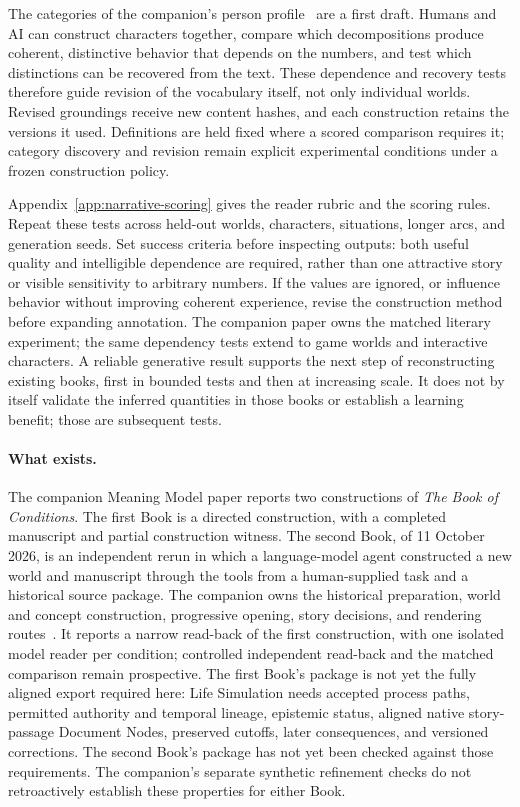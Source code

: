 \documentclass[10pt]{article}
\newcommand{\Book}{\textit{The Book of Conditions}}
\begin{document}
The categories of the companion's person profile~\cite{westerbergMeaning2026} are a
first draft. Humans and AI can construct
characters together, compare which decompositions produce coherent,
distinctive behavior that depends on the numbers, and test which distinctions
can be recovered from the text. These dependence and recovery tests therefore
guide revision of the vocabulary itself, not only individual worlds.
Revised groundings receive new content hashes, and each construction retains
the versions it used. Definitions are held fixed where a scored comparison
requires it; category discovery and revision remain explicit experimental
conditions under a frozen construction policy.

Appendix~\ref{app:narrative-scoring} gives the reader rubric and the scoring rules.
Repeat these tests across held-out worlds, characters, situations, longer arcs, and
generation seeds. Set success criteria before inspecting outputs: both useful
quality and intelligible dependence are required, rather than one attractive
story or visible sensitivity to arbitrary numbers. If the values are ignored,
or influence behavior without improving coherent experience, revise the
construction method before expanding annotation. The companion paper owns
the matched literary experiment; the same dependency tests extend to game
worlds and interactive characters. A reliable generative result supports the
next step of reconstructing existing books, first in bounded tests and then
at increasing scale. It does not by itself validate the inferred quantities
in those books or establish a learning benefit; those are subsequent tests.

\paragraph{What exists.}
The companion Meaning Model paper reports two constructions of \Book{}. The first Book is a directed construction, with a completed manuscript and partial
construction witness. The second Book, of 11 October 2026, is an independent rerun
in which a language-model agent constructed a new world and manuscript through
the tools from a human-supplied task and a historical source package. The
companion owns the historical preparation, world and concept construction,
progressive opening, story decisions, and rendering
routes~\cite{westerbergMeaning2026}. It reports a narrow read-back of the first
construction, with one isolated model reader per condition; controlled
independent read-back and the matched comparison remain prospective. The first Book's package is not yet the fully aligned
export required here: Life Simulation
needs accepted process paths, permitted authority and temporal lineage,
epistemic status, aligned native story-passage Document Nodes, preserved
cutoffs, later consequences, and versioned corrections. The second Book's package
has not yet been checked against those requirements. The companion's
separate synthetic refinement checks do not retroactively establish these
properties for either Book.
\end{document}
